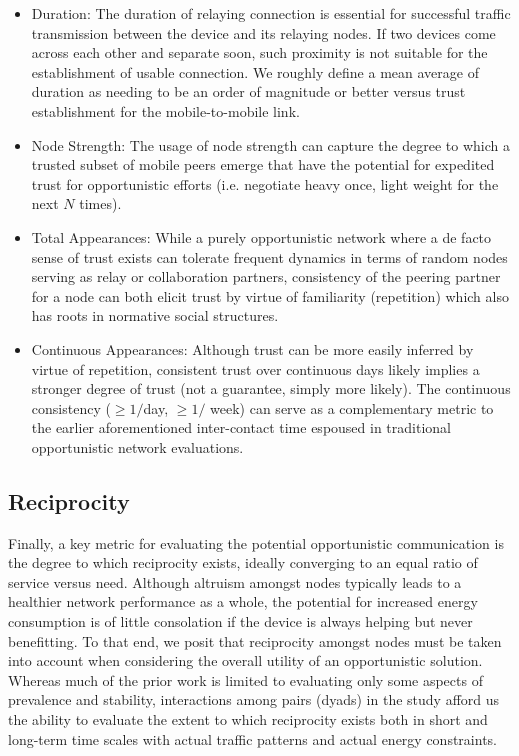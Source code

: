 \begin{itemize}

\item Duration: The duration of relaying connection is essential for successful traffic transmission between the device and its relaying nodes. If two devices come across each other and separate soon, such proximity is not suitable for the establishment of usable connection. We roughly define a mean average of duration as needing to be an order of magnitude or better versus trust establishment for the mobile-to-mobile link.

\item Node Strength: The usage of node strength can capture the degree to which a trusted subset of mobile peers emerge that have the potential for expedited trust for opportunistic efforts (i.e. negotiate heavy once, light weight for the next $N$ times).

\item Total Appearances: While a purely opportunistic network where a de facto sense of trust exists can tolerate frequent dynamics in terms of random nodes serving as relay or collaboration partners, consistency of the peering partner for a node can both elicit trust by virtue of familiarity (repetition) which also has roots in normative social structures. 

\item Continuous Appearances: Although trust can be more easily inferred by virtue of repetition, consistent trust over continuous days likely implies a stronger degree of trust (not a guarantee, simply more likely). The continuous consistency ($\geq 1 /$day, $\geq 1 / $ week) can serve as a complementary metric to the earlier aforementioned inter-contact time espoused in traditional opportunistic network evaluations.
\end{itemize}

\subsection{Reciprocity}

Finally, a key metric for evaluating the potential opportunistic communication is the degree to which reciprocity exists, ideally converging to an equal ratio of service versus need.  Although altruism amongst nodes typically leads to a healthier network performance as a whole, the potential for increased energy consumption is of little consolation if the device is always helping but never benefitting.  To that end, we posit that reciprocity amongst nodes must be taken into account when considering the overall utility of an opportunistic solution.  Whereas much of the prior work is limited to evaluating only some aspects of prevalence and stability, interactions among pairs (dyads) in the study afford us the ability to evaluate the extent to which reciprocity exists both in short and long-term time scales with actual traffic patterns and actual energy constraints.  


